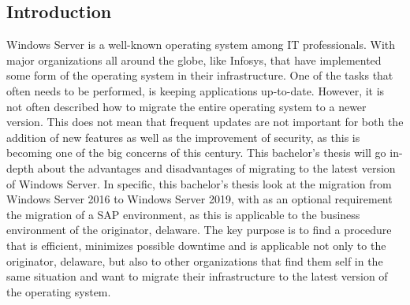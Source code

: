 \documentclass[a0,portrait]{a0poster}
\begin{document}
\begin{multicols}{2}
\section*{Introduction}
\color{black}
Windows Server is a well-known operating system among IT professionals. 
With major organizations all around the globe, like Infosys, that have implemented some form of the operating system in their infrastructure.
One of the tasks that often needs to be performed, is keeping applications up-to-date. 
However, it is not often described how to migrate the entire operating system to a newer version.  
This does not mean that frequent updates are not important for both the addition of new features as well as the improvement of security, as this is becoming one of the big concerns of this century. 
This bachelor's thesis will go in-depth about the advantages and disadvantages of migrating to the latest version of Windows Server.
In specific, this bachelor's thesis look at the migration from Windows Server 2016 to Windows Server 2019, with as an optional requirement the migration of a SAP environment, as this is applicable to the business environment of the originator, delaware.
The key purpose is to find a procedure that is efficient, minimizes possible downtime and is applicable not only to the originator, delaware, but also to other organizations that find them self in the same situation and want to migrate their infrastructure to the latest version of the operating system.
\color{Black} %
\color{HoGentAccent1} 

\end{multicols}
\end{document}
